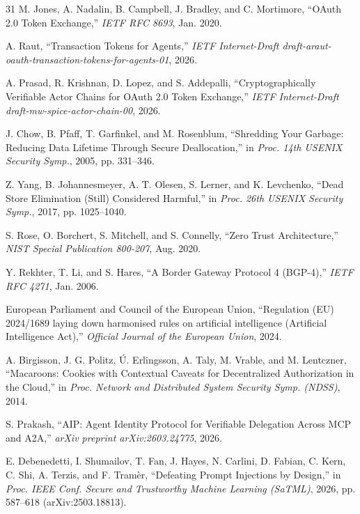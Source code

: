 \documentclass[conference,10pt]{IEEEtran}
\begin{document}
\begin{thebibliography}{31}
M. Jones, A. Nadalin, B. Campbell, J. Bradley, and C. Mortimore, ``OAuth 2.0 Token Exchange,'' \emph{IETF RFC 8693}, Jan. 2020.

A. Raut, ``Transaction Tokens for Agents,'' \emph{IETF Internet-Draft draft-araut-oauth-transaction-tokens-for-agents-01}, 2026.

A. Prasad, R. Krishnan, D. Lopez, and S. Addepalli, ``Cryptographically Verifiable Actor Chains for OAuth 2.0 Token Exchange,'' \emph{IETF Internet-Draft draft-mw-spice-actor-chain-00}, 2026.

J. Chow, B. Pfaff, T. Garfinkel, and M. Rosenblum, ``Shredding Your Garbage: Reducing Data Lifetime Through Secure Deallocation,'' in \emph{Proc. 14th USENIX Security Symp.}, 2005, pp. 331--346.

Z. Yang, B. Johannesmeyer, A. T. Olesen, S. Lerner, and K. Levchenko, ``Dead Store Elimination (Still) Considered Harmful,'' in \emph{Proc. 26th USENIX Security Symp.}, 2017, pp. 1025--1040.

S. Rose, O. Borchert, S. Mitchell, and S. Connelly, ``Zero Trust Architecture,'' \emph{NIST Special Publication 800-207}, Aug. 2020.

Y. Rekhter, T. Li, and S. Hares, ``A Border Gateway Protocol 4 (BGP-4),'' \emph{IETF RFC 4271}, Jan. 2006.

European Parliament and Council of the European Union, ``Regulation (EU) 2024/1689 laying down harmonised rules on artificial intelligence (Artificial Intelligence Act),'' \emph{Official Journal of the European Union}, 2024.

A. Birgisson, J. G. Politz, {\'U}. Erlingsson, A. Taly, M. Vrable, and M. Lentczner, ``Macaroons: Cookies with Contextual Caveats for Decentralized Authorization in the Cloud,'' in \emph{Proc. Network and Distributed System Security Symp. (NDSS)}, 2014.

S. Prakash, ``AIP: Agent Identity Protocol for Verifiable Delegation Across MCP and A2A,'' \emph{arXiv preprint arXiv:2603.24775}, 2026.

E. Debenedetti, I. Shumailov, T. Fan, J. Hayes, N. Carlini, D. Fabian, C. Kern, C. Shi, A. Terzis, and F. Tram{\`e}r, ``Defeating Prompt Injections by Design,'' in \emph{Proc. IEEE Conf. Secure and Trustworthy Machine Learning (SaTML)}, 2026, pp. 587--618 (arXiv:2503.18813).


\end{thebibliography}
\end{document}
